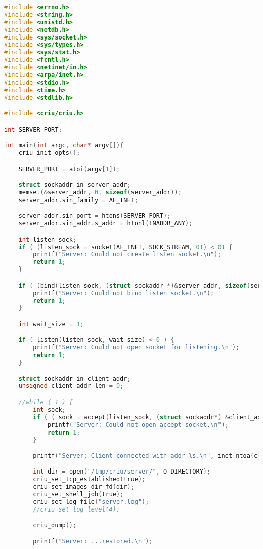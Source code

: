 \documentclass[a4paper]{article}
\begin{document}
\begin{lstlisting}[caption=Mit TCP: Server,language=C]
#include <errno.h>
#include <string.h>
#include <unistd.h>
#include <netdb.h>
#include <sys/socket.h>
#include <sys/types.h>
#include <sys/stat.h>
#include <fcntl.h>
#include <netinet/in.h>
#include <arpa/inet.h>
#include <stdio.h>
#include <time.h>
#include <stdlib.h>

#include <criu/criu.h>

int SERVER_PORT;

int main(int argc, char* argv[]){
    criu_init_opts();

    SERVER_PORT = atoi(argv[1]);

    struct sockaddr_in server_addr;
    memset(&server_addr, 0, sizeof(server_addr));
    server_addr.sin_family = AF_INET;

    server_addr.sin_port = htons(SERVER_PORT);
    server_addr.sin_addr.s_addr = htonl(INADDR_ANY);

    int listen_sock;
    if ( (listen_sock = socket(AF_INET, SOCK_STREAM, 0)) < 0) {
        printf("Server: Could not create listen socket.\n");
        return 1;
    }

    if ( (bind(listen_sock, (struct sockaddr *)&server_addr, sizeof(server_addr))) < 0 ) {
        printf("Server: Could not bind listen socket.\n");
        return 1;
    }

    int wait_size = 1;

    if ( listen(listen_sock, wait_size) < 0 ) {
        printf("Server: Could not open socket for listening.\n");
        return 1;
    }

    struct sockaddr_in client_addr;
    unsigned client_addr_len = 0;

    //while ( 1 ) {
        int sock;
        if ( ( sock = accept(listen_sock, (struct sockaddr*) &client_addr, &client_addr_len)) < 0 ) {
            printf("Server: Could not open accept socket.\n");
            return 1;
        }

        printf("Server: Client connected with addr %s.\n", inet_ntoa(client_addr.sin_addr));

        int dir = open("/tmp/criu/server/", O_DIRECTORY);
        criu_set_tcp_established(true);
        criu_set_images_dir_fd(dir);
        criu_set_shell_job(true);
        criu_set_log_file("server.log");
        //criu_set_log_level(4);

        criu_dump();

        printf("Server: ...restored.\n");



\end{lstlisting}
\end{document}
